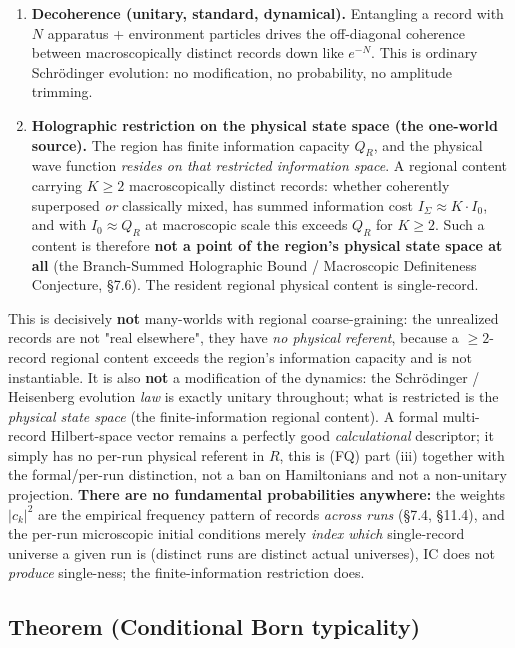 \documentclass[11pt,a4paper]{article}
\begin{document}
\begin{enumerate}
  \item \textbf{Decoherence (unitary, standard, dynamical).} Entangling a record with $N$ apparatus + environment particles drives the off-diagonal coherence between macroscopically distinct records down like $e^{-N}$. This is ordinary Schrödinger evolution: no modification, no probability, no amplitude trimming.
  \item \textbf{Holographic restriction on the physical state space (the one-world source).} The region has finite information capacity $Q_R$, and the physical wave function \emph{resides on that restricted information space}. A regional content carrying $K \ge 2$ macroscopically distinct records: whether coherently superposed \emph{or} classically mixed, has summed information cost $I_\Sigma \approx K \cdot I_0$, and with $I_0 \approx Q_R$ at macroscopic scale this exceeds $Q_R$ for $K \ge 2$. Such a content is therefore \textbf{not a point of the region's physical state space at all} (the Branch-Summed Holographic Bound / Macroscopic Definiteness Conjecture, §7.6). The resident regional physical content is single-record.
\end{enumerate}

This is decisively \textbf{not} many-worlds with regional coarse-graining: the unrealized records are not "real elsewhere", they have \emph{no physical referent}, because a $\ge 2$-record regional content exceeds the region's information capacity and is not instantiable. It is also \textbf{not} a modification of the dynamics: the Schrödinger / Heisenberg evolution \emph{law} is exactly unitary throughout; what is restricted is the \emph{physical state space} (the finite-information regional content). A formal multi-record Hilbert-space vector remains a perfectly good \emph{calculational} descriptor; it simply has no per-run physical referent in $R$, this is (FQ) part (iii) together with the formal/per-run distinction, not a ban on Hamiltonians and not a non-unitary projection. \textbf{There are no fundamental probabilities anywhere:} the weights $|c_k|^2$ are the empirical frequency pattern of records \emph{across runs} (§7.4, §11.4), and the per-run microscopic initial conditions merely \emph{index which} single-record universe a given run is (distinct runs are distinct actual universes), IC does not \emph{produce} single-ness; the finite-information restriction does.

\subsection{Theorem (Conditional Born typicality)}
\end{document}

